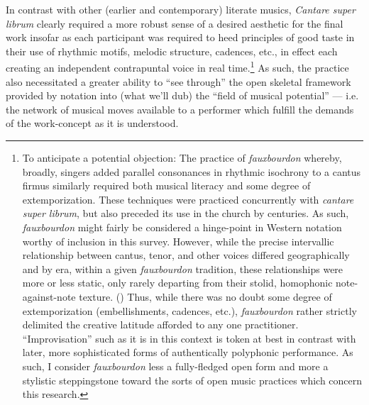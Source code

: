     In contrast with other (earlier and contemporary) literate musics, \textit{Cantare super librum} clearly required a more robust sense of a desired aesthetic for the final work insofar as each participant was required to heed principles of good taste in their use of rhythmic motifs, melodic structure, cadences, etc., in effect each creating an independent contrapuntal voice in real time.\footnote{
        To anticipate a potential objection: The practice of \textit{fauxbourdon} whereby, broadly, singers added parallel consonances in rhythmic isochrony to a cantus firmus similarly required both musical literacy and some degree of extemporization. These techniques were practiced concurrently with \textit{cantare super librum}, but also preceded its use in the church by centuries. As such, \textit{fauxbourdon} might fairly be considered a hinge-point in Western notation worthy of inclusion in this survey. However, while the precise intervallic relationship between cantus, tenor, and other voices differed geographically and by era, within a given \textit{fauxbourdon} tradition, these relationships were more or less static, only rarely departing from their stolid, homophonic note-against-note texture. (\autocite[434--7]{Taruskin_2009}) Thus, while there was no doubt some degree of extemporization (embellishments, cadences, etc.), \textit{fauxbourdon} rather strictly delimited the creative latitude afforded to any one practitioner. ``Improvisation'' such as it is in this context is token at best in contrast with later, more sophisticated forms of authentically polyphonic performance. As such, I consider \textit{fauxbourdon} less a fully-fledged open form and more a stylistic steppingstone toward the sorts of open music practices which concern this research.
    }
    As such, the practice also necessitated a greater ability to ``see through'' the open skeletal framework provided by notation into (what we'll dub) the ``field of musical potential'' --- i.e. the network of musical moves available to a performer which fulfill the demands of the work-concept as it is understood.

